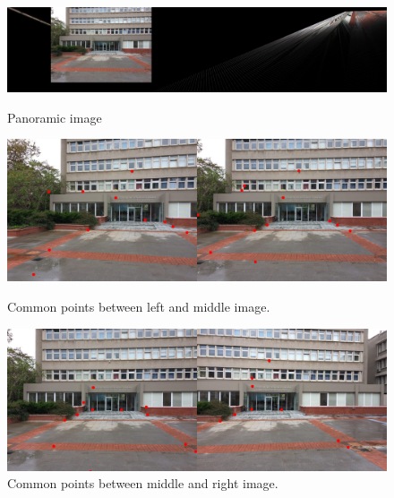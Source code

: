 \documentclass[letterpaper,12pt]{article}
\begin{document}
\begin{figure}[!htb]
        \centering\includegraphics[width=1\columnwidth]{experiments/12points/final3wrong.jpg}
          \caption{
                \label{} Panoramic image
        }
        \centering\includegraphics[width=1\columnwidth]{experiments/12points/left-1_middle3wrong.jpg}
          \caption{
                \label{} Common points between left and middle image.
        }
        \centering\includegraphics[width=1\columnwidth]{experiments/12points/middle_left-13wrong.jpg}
        \caption{
                \label{} Common points between middle and right image.
        }
\end{figure}
\FloatBarrier
\newpage
\end{document}
